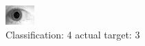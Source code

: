 \begin{figure}[h!]
\begin{center}
\includegraphics[width=0.60\columnwidth]{figures/ID1846_class_4_target_3.png}
\end{center}
\caption{ Classification: 4 actual target: 3}
\label{fig:ID1846_class_4_target_3}
\end{figure}
